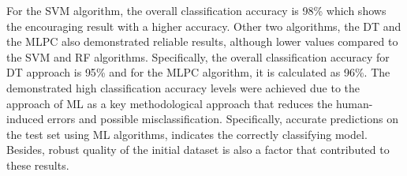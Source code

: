 \documentclass[jimaging,article,accept,pdftex,oneauthor]{Definitions/mdpi}
\begin{document}
For {the }SVM algorithm, the overall classification accuracy is {98}\% which shows the encouraging result with a higher accuracy. Other two algorithms, the DT and the MLPC also demonstrated reliable results, although lower values compared to the SVM and RF algorithms. Specifically, the overall classification accuracy for DT approach is {95}\% and for the MLPC algorithm, it is calculated as {96}\%. {The demonstrated high classification accuracy levels were achieved due to the approach of ML as a key methodological approach that reduces the human-induced errors and possible misclassification. Specifically, accurate predictions on the test set using ML algorithms, indicates the correctly classifying model. Besides, robust quality of the initial dataset is also a factor that contributed to these results.} 

\begin{table}[H]


\end{table}
\end{document}
